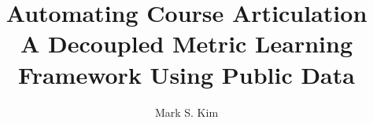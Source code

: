 \documentclass{sfsuthesis}
\begin{document}

\title{Automating Course Articulation\\\vspace*{2mm}\large A Decoupled Metric Learning Framework Using Public Data}
\makeatletter
\newcommand{\@approvaltitle}{Automating Course Articulation: A Decoupled Metric Learning Framework Using Public Data}
\makeatother
\author{Mark S. Kim}



\maketitle
\copyrightpage
\approvalpage




\begin{frontmatter}




    

    \tableofcontents
    \clearpage
    \listoftables
    \clearpage
    \listoffigures
    \clearpage

\end{frontmatter}

% 

\pagestyle{headings}








\sloppy
\printbibliography
\fussy


\end{document}
